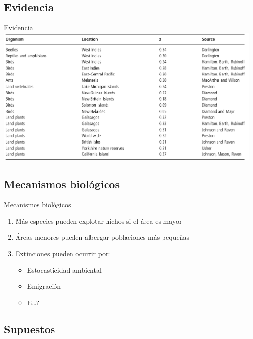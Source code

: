 \documentclass[
  11pt,
  ignorenonframetext,
]{beamer}
\begin{document}
\hypertarget{evidencia}{%
\subsection{Evidencia}\label{evidencia}}

\begin{frame}{Evidencia}
\includegraphics{Biogeografia/Spp-area.png}
\end{frame}

\hypertarget{mecanismos-bioluxf3gicos}{%
\subsection{Mecanismos biológicos}\label{mecanismos-bioluxf3gicos}}

\begin{frame}{Mecanismos biológicos}
\begin{enumerate}
\item
  Más especies pueden explotar nichos si el área es mayor
\item
  Áreas menores pueden albergar poblaciones más pequeñas
\item
  Extinciones pueden ocurrir por:

  \begin{itemize}
  \item
    Estocasticidad ambiental
  \item
    Emigración
  \item
    E\ldots?
  \end{itemize}
\end{enumerate}
\end{frame}

\hypertarget{supuestos}{%
\subsection{Supuestos}\label{supuestos}}
\end{document}

